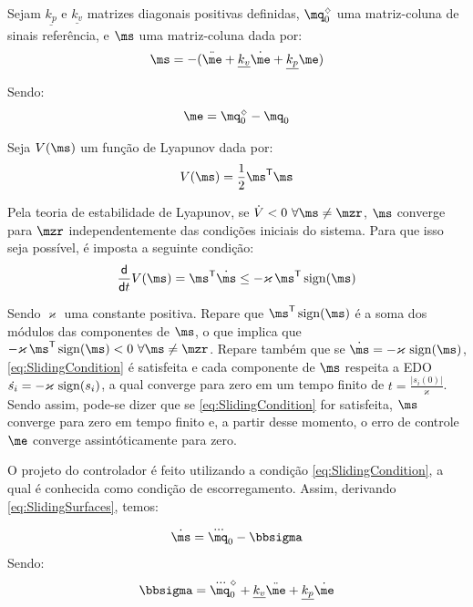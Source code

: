 \documentclass[a4paper,11pt,brazil,fleqn]{article}
\begin{document}
Sejam $\underline{k_p}$ e $\underline{k_v}$ matrizes diagonais positivas definidas, $\mq_0^\sdia$ uma matriz-coluna de sinais refer\^encia, e $\ms$ uma matriz-coluna dada por:
\begin{equation} \label{eq:SlidingSurfaces}
\ms = -(\ddot{\me} + \underline{k_v}\dot{\me} + \underline{k_p}\me)
\end{equation} 

Sendo:
\begin{equation}
\me = \mq_0^\sdia - \mq_0
\end{equation}

Seja $V(\ms)$ um fun\c{c}\~ao de Lyapunov dada por:
\begin{equation}
V(\ms) = \frac{1}{2} \ms^\msT \ms
\end{equation}

Pela teoria de estabilidade de Lyapunov, se $\dot{V} < 0 \,\, \forall \ms \neq \mzr$, $\ms$ converge para $\mzr$ independentemente das condi\c{c}\~oes iniciais do sistema. Para que isso seja poss\'ivel, \'e imposta a seguinte condi\c{c}\~ao:
\begin{equation} \label{eq:SlidingCondition}
\frac{\dd}{\dd t} V(\ms) = \ms^\msT \dot{\ms} \leq - \varkappa \, \ms^\msT \sign(\ms) 
\end{equation}

Sendo $\varkappa$ uma constante positiva. Repare que $\ms^\msT \sign(\ms)$ \'e a soma dos m\'odulos das componentes de $\ms$, o que implica que $- \varkappa \, \ms^\msT \sign(\ms) < 0 \,\, \forall \ms \neq \mzr$. Repare tamb\'em que se $\dot{\ms} = - \varkappa \,\sign(\ms)$,  \eqref{eq:SlidingCondition} \'e satisfeita e cada componente de $\ms$ respeita a EDO $\dot{s_i} = - \varkappa \,\operatorname*{sign}(s_i)$, a qual converge para zero em um tempo finito de $t = \frac{|s_i(0)|}{\varkappa}$. Sendo assim, pode-se dizer que se \eqref{eq:SlidingCondition} for satisfeita, $\ms$ converge para zero em tempo finito e, a partir desse momento, o erro de controle $\me$ converge assint\'oticamente para zero.

O projeto do controlador \'e feito utilizando a condi\c{c}\~ao \eqref{eq:SlidingCondition}, a qual \'e conhecida como condi\c{c}\~ao de escorregamento. Assim, derivando \eqref{eq:SlidingSurfaces}, temos:

\begin{equation} \label{eq:DSlidingSurfaces}
\dot{\ms} = \dddot{\mq}_0 - \msigma
\end{equation}
Sendo:
\begin{equation}
\msigma = \dddot{\mq}_0^\sdia + \underline{k_v}\ddot{\me} + \underline{k_p}\dot{\me}
\end{equation}
\end{document}
